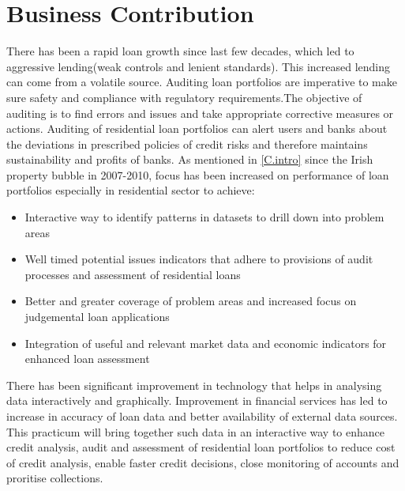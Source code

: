 \section{Business Contribution}
There has been a rapid loan growth since last few decades, which led to aggressive lending(weak controls and lenient standards). This increased lending can come from a volatile source. Auditing loan portfolios are imperative to make sure safety and compliance with regulatory requirements.The objective of auditing is to find errors and issues and take appropriate corrective measures or actions. Auditing of residential loan portfolios can alert users and banks about the deviations in prescribed policies of credit risks and therefore maintains sustainability and profits of banks. As mentioned in \ref{C.intro} since the Irish property bubble in 2007-2010, focus has been increased on performance of loan portfolios especially in residential sector to achieve:
\begin{itemize}
\item Interactive way to identify patterns in datasets to drill down into problem areas
\item Well timed potential issues indicators that adhere to provisions of audit processes and assessment of residential loans
\item Better and greater coverage of problem areas and increased focus on judgemental loan applications
\item Integration of useful and relevant market data and economic indicators for enhanced loan assessment
\end{itemize}

There has been significant improvement in technology that helps in analysing data interactively and graphically. Improvement in financial services has led to increase in accuracy of loan data and better availability of external data sources. This practicum will bring together such data in an interactive way to enhance credit analysis, audit and assessment of residential loan portfolios to reduce cost of credit analysis, enable faster credit decisions, close monitoring of accounts and proritise collections.
 